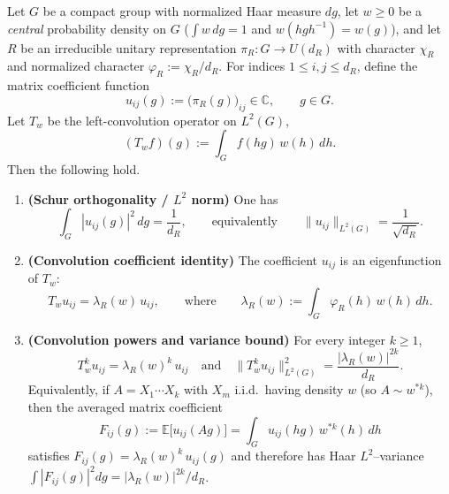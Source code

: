 \begin{lemma}\label{lem:routeC_matrix_coeff_decay}
Let $G$ be a compact group with normalized Haar measure $dg$, let $w\ge 0$ be a \emph{central} probability density on $G$
($\int w\,dg=1$ and $w(hgh^{-1})=w(g)$), and let $R$ be an irreducible unitary representation
$\pi_R:G\to U(d_R)$ with character $\chi_R$ and normalized character $\varphi_R:=\chi_R/d_R$.
For indices $1\le i,j\le d_R$, define the matrix coefficient function
\[
u_{ij}(g):=\bigl(\pi_R(g)\bigr)_{ij}\in\mathbb C,
\qquad g\in G.
\]
Let $T_w$ be the left-convolution operator on $L^2(G)$,
\[
(T_w f)(g):=\int_G f(hg)\,w(h)\,dh.
\]
Then the following hold.
\begin{enumerate}[label=(\alph*)]
\item \textbf{(Schur orthogonality / $L^2$ norm)} One has
\begin{equation}\label{eq:routeC_schur_uij_norm}
\int_G |u_{ij}(g)|^2\,dg=\frac{1}{d_R},
\qquad\text{equivalently}\qquad
\|u_{ij}\|_{L^2(G)}=\frac{1}{\sqrt{d_R}}.
\end{equation}
\item \textbf{(Convolution coefficient identity)} The coefficient $u_{ij}$ is an eigenfunction of $T_w$:
\begin{equation}\label{eq:routeC_convolution_eigen}
T_w u_{ij}=\lambda_R(w)\,u_{ij},
\qquad\text{where}\qquad
\lambda_R(w):=\int_G \varphi_R(h)\,w(h)\,dh.
\end{equation}
\item \textbf{(Convolution powers and variance bound)} For every integer $k\ge 1$,
\begin{equation}\label{eq:routeC_convolution_power_norm}
T_w^k u_{ij}=\lambda_R(w)^k\,u_{ij}
\quad\text{and}\quad
\|T_w^k u_{ij}\|_{L^2(G)}^2=\frac{|\lambda_R(w)|^{2k}}{d_R}.
\end{equation}
Equivalently, if $A=X_1\cdots X_k$ with $X_m$ i.i.d.\ having density $w$ (so $A\sim w^{*k}$), then
the averaged matrix coefficient
\[
F_{ij}(g):=\mathbb E\bigl[u_{ij}(Ag)\bigr]=\int_G u_{ij}(hg)\,w^{*k}(h)\,dh
\]
satisfies $F_{ij}(g)=\lambda_R(w)^k\,u_{ij}(g)$ and therefore has Haar $L^2$--variance
$\int |F_{ij}(g)|^2dg=|\lambda_R(w)|^{2k}/d_R$.
\end{enumerate}
\end{lemma}

